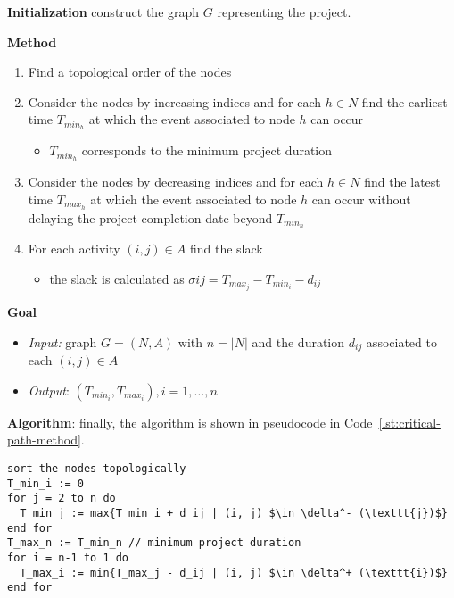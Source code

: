 \documentclass[english]{article}
\begin{document}
\bigskip
\textbf{Initialization}
construct the graph \(G\) representing the project.

\bigskip
\textbf{Method}

\begin{enumerate}
  \item Find a topological order of the nodes
  \item Consider the nodes by increasing indices and for each \(h \in N\) find the earliest time \(T_{min_h}\) at which the event associated to node \(h\) can occur
        \begin{itemize}[label = \(\rightarrow\)]
          \item \(T_{min_h}\) corresponds to the minimum project duration
        \end{itemize}
  \item Consider the nodes by decreasing indices and for each \(h \in N\) find the latest time \(T_{max_h}\) at which the event associated to node \(h\) can occur without delaying the project completion date beyond \(T_{min_n}\)
  \item For each activity \(\left( i, j \right) \in A\) find the slack
        \begin{itemize}[label = \(\rightarrow\)]
          \item the slack is calculated as \(\sigma{ij} = T_{max_j} - T_{min_i} - d_{ij}\)
        \end{itemize}
\end{enumerate}

\bigskip
\textbf{Goal}
\begin{itemize}[label=\(\rightarrow\)]
  \item \textit{Input:} graph \(G = (N, A)\) with \(n = |N|\) and the duration \(d_{ij}\) associated to each \(\left( i, j \right) \in A\)
  \item \textit{Output}: \(\left( T_{min_i}, T_{max_i} \right), i = 1, \ldots, n\)
\end{itemize}

\bigskip
\textbf{Algorithm}:
finally, the algorithm is shown in pseudocode in Code~\ref{lst:critical-path-method}.

\begin{lstlisting}[style=custom, language=pseudocode, caption={Critical path method}, label={lst:critical-path-method}, float]
sort the nodes topologically
T_min_i := 0
for j = 2 to n do
  T_min_j := max{T_min_i + d_ij | (i, j) $\in \delta^- (\texttt{j})$}
end for
T_max_n := T_min_n // minimum project duration
for i = n-1 to 1 do
  T_max_i := min{T_max_j - d_ij | (i, j) $\in \delta^+ (\texttt{i})$}
end for
\end{lstlisting}
\end{document}
